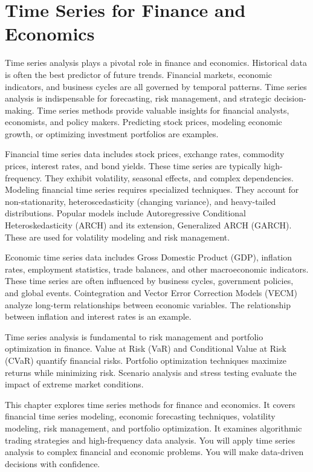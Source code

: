 \chapter{Time Series for Finance and Economics}



Time series analysis plays a pivotal role in finance and economics. Historical data is often the best predictor of future trends. Financial markets, economic indicators, and business cycles are all governed by temporal patterns. Time series analysis is indispensable for forecasting, risk management, and strategic decision-making. Time series methods provide valuable insights for financial analysts, economists, and policy makers. Predicting stock prices, modeling economic growth, or optimizing investment portfolios are examples.

Financial time series data includes stock prices, exchange rates, commodity prices, interest rates, and bond yields. These time series are typically high-frequency. They exhibit volatility, seasonal effects, and complex dependencies. Modeling financial time series requires specialized techniques. They account for non-stationarity, heteroscedasticity (changing variance), and heavy-tailed distributions. Popular models include Autoregressive Conditional Heteroskedasticity (ARCH) and its extension, Generalized ARCH (GARCH). These are used for volatility modeling and risk management.

Economic time series data includes Gross Domestic Product (GDP), inflation rates, employment statistics, trade balances, and other macroeconomic indicators. These time series are often influenced by business cycles, government policies, and global events. Cointegration and Vector Error Correction Models (VECM) analyze long-term relationships between economic variables. The relationship between inflation and interest rates is an example.

Time series analysis is fundamental to risk management and portfolio optimization in finance. Value at Risk (VaR) and Conditional Value at Risk (CVaR) quantify financial risks. Portfolio optimization techniques maximize returns while minimizing risk. Scenario analysis and stress testing evaluate the impact of extreme market conditions.

This chapter explores time series methods for finance and economics. It covers financial time series modeling, economic forecasting techniques, volatility modeling, risk management, and portfolio optimization. It examines algorithmic trading strategies and high-frequency data analysis. You will apply time series analysis to complex financial and economic problems. You will make data-driven decisions with confidence.




